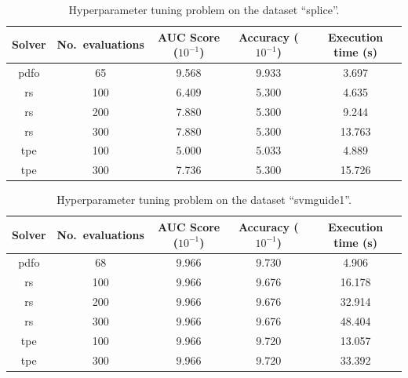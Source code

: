 \documentclass[11pt,draft]{article}
\numberwithin{equation}{section}
\begin{document}
\begin{table}[!ht]
    \caption{Hyperparameter tuning problem on the dataset \enquote{splice}.}
    \centering
    \begin{tabular}{cS[table-parse-only]SSS}
        \toprule
        Solver                          &
            {No.\ evaluations}              &
            {AUC Score ($10^{-1}$)}         &
            {Accuracy ($10^{-1}$)}          &
            {Execution time (\si{\second})}\\
        \midrule
        \gls{pdfo}  & 65    & 9.568 & 9.933 & 3.697\\
        \gls{rs}    & 100   & 6.409 & 5.300 & 4.635\\
        \gls{rs}    & 200   & 7.880 & 5.300 & 9.244\\
        \gls{rs}    & 300   & 7.880 & 5.300 & 13.763\\
        \gls{tpe}   & 100   & 5.000 & 5.033 & 4.889\\
        \gls{tpe}   & 300   & 7.736 & 5.300 & 15.726\\
        \bottomrule
    \end{tabular}
\end{table}

\begin{table}[!ht]
    \caption{Hyperparameter tuning problem on the dataset \enquote{svmguide1}.}
    \centering
    \begin{tabular}{cS[table-parse-only]SSS}
        \toprule
        Solver                          &
            {No.\ evaluations}              &
            {AUC Score ($10^{-1}$)}         &
            {Accuracy ($10^{-1}$)}          &
            {Execution time (\si{\second})}\\
        \midrule
        \gls{pdfo}  & 68    & 9.966 & 9.730 & 4.906\\
        \gls{rs}    & 100   & 9.966 & 9.676 & 16.178\\
        \gls{rs}    & 200   & 9.966 & 9.676 & 32.914\\
        \gls{rs}    & 300   & 9.966 & 9.676 & 48.404\\
        \gls{tpe}   & 100   & 9.966 & 9.720 & 13.057\\
        \gls{tpe}   & 300   & 9.966 & 9.720 & 33.392\\
        \bottomrule
    \end{tabular}
\end{table}
\end{document}
